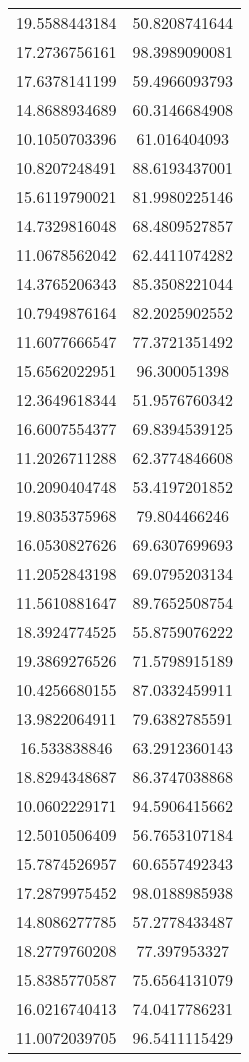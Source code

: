 \begin{table}
\begin{tabular}{cc}
19.5588443184 & 50.8208741644 \\
17.2736756161 & 98.3989090081 \\
17.6378141199 & 59.4966093793 \\
14.8688934689 & 60.3146684908 \\
10.1050703396 & 61.016404093 \\
10.8207248491 & 88.6193437001 \\
15.6119790021 & 81.9980225146 \\
14.7329816048 & 68.4809527857 \\
11.0678562042 & 62.4411074282 \\
14.3765206343 & 85.3508221044 \\
10.7949876164 & 82.2025902552 \\
11.6077666547 & 77.3721351492 \\
15.6562022951 & 96.300051398 \\
12.3649618344 & 51.9576760342 \\
16.6007554377 & 69.8394539125 \\
11.2026711288 & 62.3774846608 \\
10.2090404748 & 53.4197201852 \\
19.8035375968 & 79.804466246 \\
16.0530827626 & 69.6307699693 \\
11.2052843198 & 69.0795203134 \\
11.5610881647 & 89.7652508754 \\
18.3924774525 & 55.8759076222 \\
19.3869276526 & 71.5798915189 \\
10.4256680155 & 87.0332459911 \\
13.9822064911 & 79.6382785591 \\
16.533838846 & 63.2912360143 \\
18.8294348687 & 86.3747038868 \\
10.0602229171 & 94.5906415662 \\
12.5010506409 & 56.7653107184 \\
15.7874526957 & 60.6557492343 \\
17.2879975452 & 98.0188985938 \\
14.8086277785 & 57.2778433487 \\
18.2779760208 & 77.397953327 \\
15.8385770587 & 75.6564131079 \\
16.0216740413 & 74.0417786231 \\
11.0072039705 & 96.5411115429 \\

\end{tabular}
\end{table}
